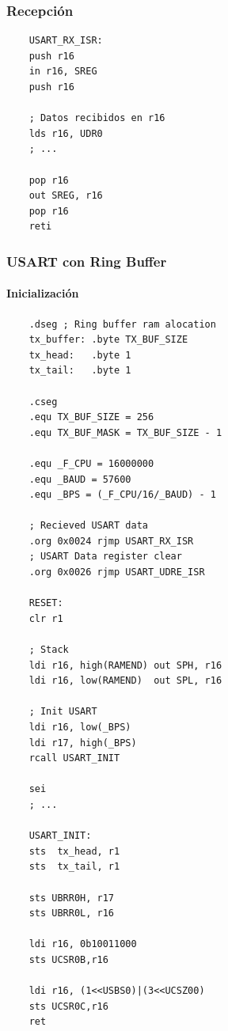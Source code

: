     \subsubsection{Recepción}

    \begin{verbatim}
    USART_RX_ISR:
    push r16 
    in r16, SREG 
    push r16 

    ; Datos recibidos en r16
    lds r16, UDR0
    ; ...

    pop r16
    out SREG, r16
    pop r16	
    reti
    \end{verbatim}
    \subsubsection{USART con Ring Buffer}


    \paragraph*{Inicialización}
    \begin{verbatim}
    .dseg ; Ring buffer ram alocation
    tx_buffer: .byte TX_BUF_SIZE  
    tx_head:   .byte 1            
    tx_tail:   .byte 1           

    .cseg
    .equ TX_BUF_SIZE = 256
    .equ TX_BUF_MASK = TX_BUF_SIZE - 1

    .equ _F_CPU = 16000000
    .equ _BAUD = 57600 
    .equ _BPS = (_F_CPU/16/_BAUD) - 1
    
    ; Recieved USART data
    .org 0x0024 rjmp USART_RX_ISR	
    ; USART Data register clear
    .org 0x0026 rjmp USART_UDRE_ISR 

    RESET:
    clr r1

    ; Stack 
    ldi r16, high(RAMEND) out SPH, r16
    ldi r16, low(RAMEND)  out SPL, r16

    ; Init USART
    ldi r16, low(_BPS)
    ldi r17, high(_BPS)
    rcall USART_INIT

    sei
    ; ...

    USART_INIT:	
    sts  tx_head, r1
    sts  tx_tail, r1

    sts UBRR0H, r17
    sts UBRR0L, r16

    ldi r16, 0b10011000
    sts UCSR0B,r16

    ldi r16, (1<<USBS0)|(3<<UCSZ00)
    sts UCSR0C,r16
    ret
    \end{verbatim}


